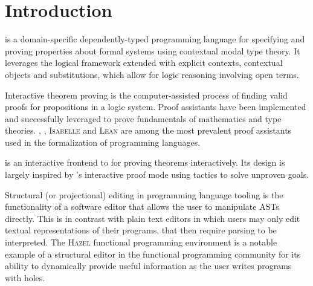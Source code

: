 \chapter{Introduction}





\Beluga is a domain-specific dependently-typed programming language for specifying and proving properties about formal systems using contextual modal type theory.
It leverages the logical framework \LF extended with explicit contexts, contextual objects and substitutions, which allow for logic reasoning involving open terms.


Interactive theorem proving is the computer-assisted process of finding valid proofs for propositions in a logic system.
Proof assistants have been implemented and successfully leveraged to prove fundamentals of mathematics and type theories.
\Agda, \Coq, \textsc{Isabelle} and \textsc{Lean} are among the most prevalent proof assistants used in the formalization of programming languages.

\Harpoon is an interactive frontend to \Beluga for proving theorems interactively.
Its design is largely inspired by \Coq's interactive proof mode using tactics to solve unproven goals.

Structural (or projectional) editing in programming language tooling is the functionality of a software editor that allows the user to manipulate \acp{AST} directly.
This is in contrast with plain text editors in which users may only edit textual representations of their programs, that then require parsing to be interpreted.
The \textsc{Hazel} functional programming environment is a notable example of a structural editor in the functional programming community for its ability to dynamically provide useful information as the user writes programs with holes.

